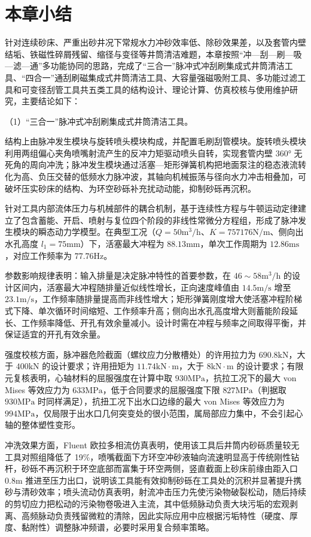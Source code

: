 \section{本章小结}

针对连续砂床、严重出砂井况下常规水力冲砂效率低、除砂效果差，以及套管内壁结垢、铁磁性碎屑残留、缩径与变径等井筒清洁难题，本章按照“冲—刮—刷—吸—滤—通”多功能协同的思路，完成了“三合一”脉冲式冲刮刷集成式井筒清洁工具、“四合一”通刮刷磁集成式井筒清洁工具、大容量强磁吸附工具、多功能过滤工具和可变径刮管工具共五类工具的结构设计、理论计算、仿真校核与使用维护研究，主要结论如下：

（1）“三合一”脉冲式冲刮刷集成式井筒清洁工具。

结构上由脉冲发生模块与旋转喷头模块构成，并配置毛刷刮管模块。旋转喷头模块利用两组偏心夹角喷嘴射流产生的反冲力矩驱动喷头自转，实现套管内壁 360° 无死角的周向冲洗；脉冲发生模块通过活塞—矩形弹簧机构把地面泵注的稳态液流转化为高、负压交替的低频水力脉冲波，其轴向机械振荡与径向水力冲击相叠加，可破坏压实砂床的结构、为环空砂砾补充扰动动能，抑制砂砾再沉积。
	
针对工具内部流体压力与机械部件的耦合机制，基于连续性方程与牛顿运动定律建立了包含蓄能、开启、喷射与复位四个阶段的非线性常微分方程组，形成了脉冲发生模块的瞬态动力学模型。在典型工况（$Q=50\mathrm{m^3/h}$、$K=757176\mathrm{N/m}$、侧向出水孔高度 $l_1=75\mathrm{mm}$）下，活塞最大冲程为 $88.13\mathrm{mm}$，单次工作周期为 $12.86\mathrm{ms}$，对应工作频率为 $77.76\mathrm{Hz}$。
	
参数影响规律表明：输入排量是决定脉冲特性的首要参数，在 $46\sim58\mathrm{m^3/h}$ 的设计区间内，活塞最大冲程随排量近似线性增长，正向速度峰值由 $14.5\mathrm{m/s}$ 增至 $23.1\mathrm{m/s}$，工作频率随排量提高而非线性增大；矩形弹簧刚度增大使活塞冲程阶梯式下降、单次循环时间缩短、工作频率升高；侧向出水孔高度增大则蓄能阶段延长、工作频率降低、开孔有效余量减小。设计时需在冲程与频率之间取得平衡，并保证适宜的开孔有效余量。

强度校核方面，脉冲器危险截面（螺纹应力分散槽处）的许用拉力为 $690.8\mathrm{kN}$，大于 $400\mathrm{kN}$ 的设计要求；许用扭矩为 $11.74\mathrm{kN\cdot m}$，大于 $8\mathrm{kN\cdot m}$ 的设计要求；有限元复核表明，心轴材料的屈服强度在计算中取 $930\mathrm{MPa}$，抗拉工况下的最大 von Mises 等效应力为 $633\mathrm{MPa}$，低于合同要求的屈服强度下限 $827\mathrm{MPa}$（判据取 $930\mathrm{MPa}$ 时同样满足），抗扭工况下出水口边缘的最大 von Mises 等效应力为 $994\mathrm{MPa}$，仅局限于出水口几何突变处的很小范围，属局部应力集中，不会引起心轴的整体塑性变形。
	
冲洗效果方面，Fluent 欧拉多相流仿真表明，使用该工具后井筒内砂砾质量较无工具对照组降低了 19\%，喷嘴截面下方环空冲砂液轴向流速明显高于传统刚性钻杆，砂砾不再沉积于环空底部而富集于环空两侧，竖直截面上砂床前缘由距入口 $0.8\mathrm{m}$ 推进至压力出口，说明该工具能有效抑制砂砾在工具处的沉积并显著提升携砂与清砂效率；喷头流动仿真表明，射流冲击压力先使污染物破裂松动，随后持续的剪切应力把松动的污染物卷吸进入主流，其中低频脉动负责大块污垢的宏观剥离、高频脉动负责残留微粒的清除，因此实际应用中应根据污垢特性（硬度、厚度、黏附性）调整脉冲频谱，必要时采用复合频率策略。

